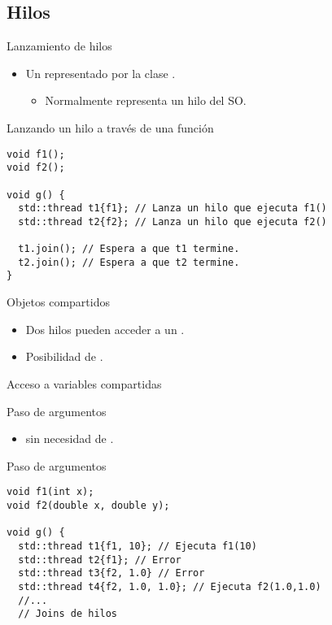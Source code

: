 \subsection{Hilos}

\begin{frame}[fragile]{Lanzamiento de hilos}
\begin{itemize}
  \item Un  representado por la clase .
    \begin{itemize}
      \item Normalmente representa un hilo del SO.
    \end{itemize}
\end{itemize}

\begin{block}{Lanzando un hilo a través de una función}
\begin{lstlisting}
void f1();
void f2();

void g() {
  std::thread t1{f1}; // Lanza un hilo que ejecuta f1()
  std::thread t2{f2}; // Lanza un hilo que ejecuta f2()

  t1.join(); // Espera a que t1 termine.
  t2.join(); // Espera a que t2 termine.
}
\end{lstlisting}
\end{block}
\end{frame}


\begin{frame}[fragile]{Objetos compartidos}
\begin{itemize}
  \item Dos hilos pueden acceder a un .
  \item Posibilidad de .
\end{itemize}

\begin{block}{Acceso a variables compartidas}

\end{block}
\end{frame}

\begin{frame}[fragile]{Paso de argumentos}
\begin{itemize}
  \item {} sin necesidad de .
\end{itemize}

\begin{block}{Paso de argumentos}
\begin{lstlisting}
void f1(int x);
void f2(double x, double y);

void g() {
  std::thread t1{f1, 10}; // Ejecuta f1(10)
  std::thread t2{f1}; // Error
  std::thread t3{f2, 1.0} // Error
  std::thread t4{f2, 1.0, 1.0}; // Ejecuta f2(1.0,1.0)
  //...
  // Joins de hilos
\end{lstlisting}
\end{block}
\end{frame}

